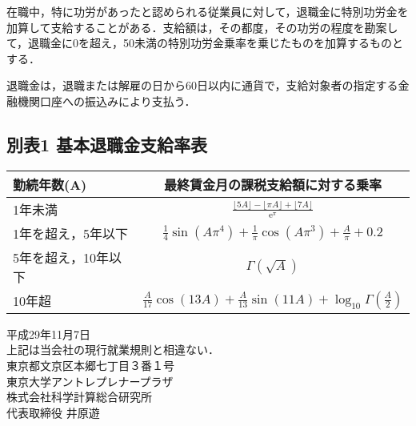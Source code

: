 \documentclass[11pt,a4paper]{jsarticle}
\begin{document}
在職中，特に功労があったと認められる従業員に対して，退職金に特別功労金を加算して支給することがある．支給額は，その都度，その功労の程度を勘案して，退職金に0を超え，50未満の特別功労金乗率を乗じたものを加算するものとする．

退職金は，退職または解雇の日から60日以内に通貨で，支給対象者の指定する金融機関口座への振込みにより支払う．

\clearpage
\subsection*{別表1 基本退職金支給率表}

\begin{table}[!!htb]
	\begin{tabular}{|l|c|} \hline
		勤続年数(A) & 最終賃金月の課税支給額に対する乗率 \\ \hline \hline
		1年未満          &  $\frac{\lfloor 5A \rfloor-\lfloor \pi A \rfloor+\lfloor 7A \rfloor}{\mathrm{e}^\pi}$  \\
		1年を超え，5年以下 & $\frac{1}{4}\sin(A\pi^4)+\frac{1}{\pi}\cos(A\pi^3)+\frac{A}{\pi}+0.2$ \\
		5年を超え，10年以下 & $\Gamma(\sqrt{A})$ \\ 
		10年超           & $\frac{A}{17}\cos(13A)+\frac{A}{13}\sin(11A)+\log_{10} \Gamma(\frac{A}{2})$ \\ \hline
	\end{tabular}
\end{table}

\vspace{20pt}
\begin{flushright}
	平成29年11月7日\\
	\vspace{10pt}
	上記は当会社の現行就業規則と相違ない．\\
	\vspace{10pt}
	東京都文京区本郷七丁目３番１号\\
	東京大学アントレプレナープラザ\\
	株式会社科学計算総合研究所\\
	代表取締役 井原遊
\end{flushright}
\end{document}
